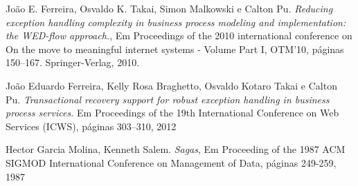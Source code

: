\documentclass[conference]{IEEEtran}
\begin{document}

%
%
%
\begin{thebibliography}{1}

João E. Ferreira, Osvaldo K. Takai, Simon Malkowski e Calton Pu. 
\emph{Reducing exception handling complexity in business process modeling and implementation:
the WED-flow approach.}, Em Proceedings of the 2010 international conference on
On the move to meaningful internet systems - Volume Part I, OTM’10, páginas
150–167. Springer-Verlag, 2010.

João Eduardo Ferreira, Kelly Rosa Braghetto, Osvaldo Kotaro Takai e
Calton Pu.\emph{ Transactional recovery support for robust exception handling in business process
services.} Em Proceedings of the 19th International Conference on Web Services (ICWS), páginas
303–310, 2012

Hector Garcia Molina, Kenneth Salem.
\emph{Sagas}, Em Proceeding of the 1987 ACM SIGMOD International Conference on Management of Data, páginas 249-259, 1987


\end{thebibliography}

% 
\end{document}

